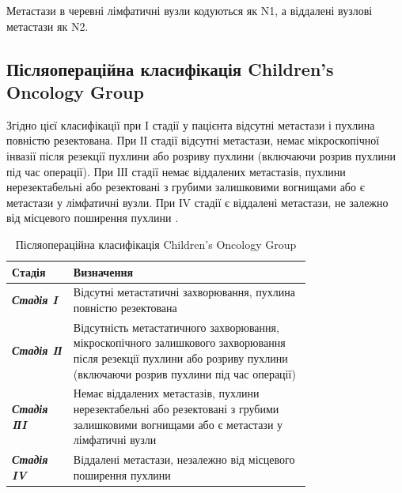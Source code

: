 Метастази в черевні лімфатичні вузли кодуються як N1, а віддалені вузлові метастази як N2.
\subsection{Післяопераційна класифікація Children’s Oncology Group }

Згідно цієї класифікації при I стадії у пацієнта відсутні метастази і пухлина повністю резектована. При ІІ стадії відсутні метастази, немає мікроскопічної інвазії після резекції пухлини або розриву пухлини (включаючи розрив пухлини під час операції). При ІІІ стадії немає віддалених метастазів, пухлини нерезектабельні або резектовані з грубими залишковими вогнищами або є метастази у лімфатичні вузли. При ІV стадії є віддалені метастази, не залежно від місцевого поширення пухлини \cite{pmid24852330}.


\begin{table}[]
\small
\caption{Післяопераційна класифікація Children’s Oncology Group\cite{pmid24852330}}
\label{table:subPRETEXT}

\centering

\normalsize
\begin{tabular}{|p{0.15\linewidth} | p{0.6\linewidth}|}
\hline
\textbf{Стадія}                                    & \textbf{Визначення}                                                                     \\ \hline
{\color[HTML]{202124} \textit{\textbf{Стадія I}}}  & {\color[HTML]{202124} Відсутні метастатичні захворювання, пухлина повністю резектована} \\ \hline
{\color[HTML]{202124} \textit{\textbf{Стадія IІ}}} &
  {\color[HTML]{202124} Відсутність метастатичного захворювання, 
  мікроскопічного залишкового захворювання після резекції пухлини або розриву пухлини 
  (включаючи розрив пухлини під час операції)} \\ \hline
{\color[HTML]{202124} \textit{\textbf{Стадія IІI}}} &
  {\color[HTML]{202124} Немає віддалених метастазів, 
  пухлини нерезектабельні або 
  резектовані з грубими залишковими вогнищами
  або є метастази у лімфатичні вузли} \\ \hline
{\color[HTML]{202124} \textit{\textbf{Стадія IV}}} & {\color[HTML]{202124} Віддалені метастази, незалежно від місцевого поширення пухлини}      \\ \hline
\end{tabular}%

\end{table}


